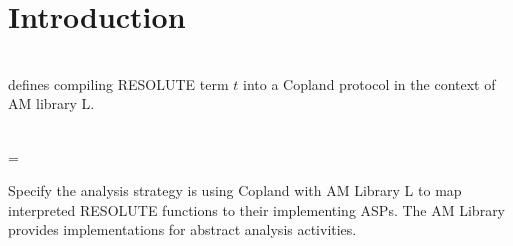 \section{Introduction}

\reservestyle{\command}{\textsf}

\begin{definition}[Compilation]\\
   defines compiling \textsf{RESOLUTE} term $t$ into a
  \textsf{Copland} protocol in the context of AM library L.
\end{definition}

\begin{definition}[Strategy] \\
   = 
\end{definition}

Specify the analysis strategy is using Copland with AM Library L to
map interpreted RESOLUTE functions to their implementing ASPs.  The AM
Library provides implementations for abstract analysis activities.


